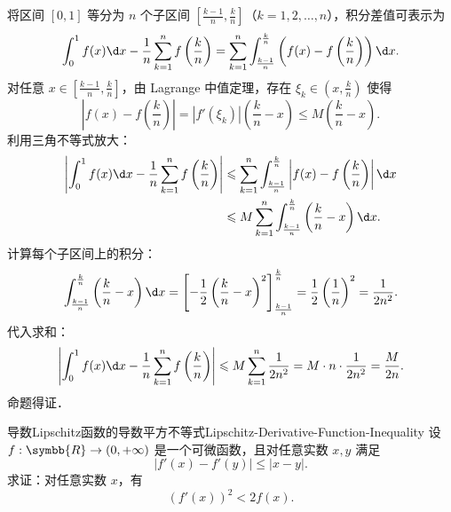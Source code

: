 \begin{myproof}
    将区间 $[0, 1]$ 等分为 $n$ 个子区间 $\left[\frac{k-1}{n}, \frac{k}{n}\right]$（$k = 1, 2, \dots, n$），积分差值可表示为
    \begin{equation}
        \int_0^1 f(x) \d x - \frac{1}{n}\sum_{k=1}^n f\left(\frac{k}{n}\right) = \sum_{k=1}^n \int_{\frac{k-1}{n}}^{\frac{k}{n}} \left( f(x) - f\left(\frac{k}{n}\right) \right) \d x.
    \end{equation}
    对任意 $x \in \left[\frac{k-1}{n}, \frac{k}{n}\right]$，由 Lagrange 中值定理，存在 $\xi_k \in \left(x, \frac{k}{n}\right)$ 使得
    \begin{equation}
        \left| f(x) - f\left(\frac{k}{n}\right) \right| = |f'(\xi_k)| \left( \frac{k}{n} - x \right) \leqslant M \left( \frac{k}{n} - x \right).
    \end{equation}
    利用三角不等式放大：
    \begin{equation}
        \begin{aligned}
            \left| \int_0^1 f(x) \d x - \frac{1}{n}\sum_{k=1}^n f\left(\frac{k}{n}\right) \right| & \leqslant \sum_{k=1}^n \int_{\frac{k-1}{n}}^{\frac{k}{n}} \left| f(x) - f\left(\frac{k}{n}\right) \right| \d x \\
                                                                                                  & \leqslant M \sum_{k=1}^n \int_{\frac{k-1}{n}}^{\frac{k}{n}} \left( \frac{k}{n} - x \right) \d x.
        \end{aligned}
    \end{equation}
    计算每个子区间上的积分：
    \begin{equation}
        \int_{\frac{k-1}{n}}^{\frac{k}{n}} \left( \frac{k}{n} - x \right) \d x = \left[ -\frac{1}{2}\left(\frac{k}{n} - x\right)^2 \right]_{\frac{k-1}{n}}^{\frac{k}{n}} = \frac{1}{2}\left(\frac{1}{n}\right)^2 = \frac{1}{2n^2}.
    \end{equation}
    代入求和：
    \begin{equation}
        \left| \int_0^1 f(x) \d x - \frac{1}{n}\sum_{k=1}^n f\left(\frac{k}{n}\right) \right| \leqslant M \sum_{k=1}^n \frac{1}{2n^2} = M \cdot n \cdot \frac{1}{2n^2} = \frac{M}{2n}.
    \end{equation}
    命题得证．
\end{myproof}

\begin{problem}{导数Lipschitz函数的导数平方不等式}{Lipschitz-Derivative-Function-Inequality}
    设 $f : \symbb{R} \to (0, +\infty)$ 是一个可微函数，且对任意实数 $x, y$ 满足
    \begin{equation}
        |f'(x) - f'(y)| \leqslant |x - y|.
    \end{equation}
    求证：对任意实数 $x$，有
    \begin{equation}
        (f'(x))^2 < 2f(x).
    \end{equation}
\end{problem}


